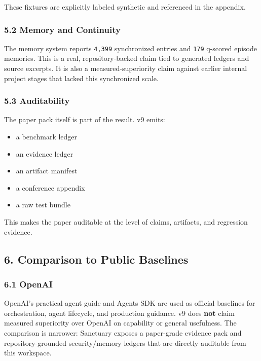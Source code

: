 \documentclass[
]{article}
\providecommand{\tightlist}{%
  \setlength{\itemsep}{0pt}\setlength{\parskip}{0pt}}
\begin{document}
These fixtures are explicitly labeled synthetic and referenced in the appendix.

\subsubsection{5.2 Memory and Continuity}\label{memory-and-continuity}

The memory system reports \texttt{4,399} synchronized entries and \texttt{179} q-scored episode memories. This is a real, repository-backed claim tied to generated ledgers and source excerpts. It is also a measured-superiority claim against earlier internal project stages that lacked this synchronized scale.

\subsubsection{5.3 Auditability}\label{auditability}

The paper pack itself is part of the result. v9 emits:

\begin{itemize}
\tightlist
\item
  a benchmark ledger
\item
  an evidence ledger
\item
  an artifact manifest
\item
  a conference appendix
\item
  a raw test bundle
\end{itemize}

This makes the paper auditable at the level of claims, artifacts, and regression evidence.

\subsection{6. Comparison to Public Baselines}\label{comparison-to-public-baselines}

\subsubsection{6.1 OpenAI}\label{openai}

OpenAI's practical agent guide and Agents SDK are used as official baselines for orchestration, agent lifecycle, and production guidance. v9 does \textbf{not} claim measured superiority over OpenAI on capability or general usefulness. The comparison is narrower: Sanctuary exposes a paper-grade evidence pack and repository-grounded security/memory ledgers that are directly auditable from this workspace.
\end{document}
